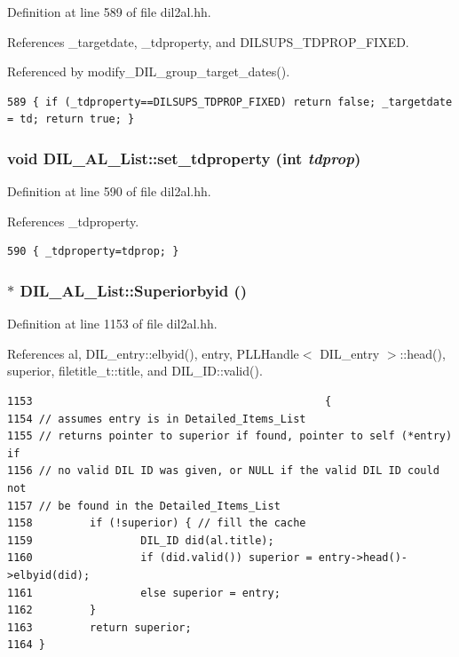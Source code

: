Definition at line 589 of file dil2al.hh.

References \_\-targetdate, \_\-tdproperty, and DILSUPS\_\-TDPROP\_\-FIXED.

Referenced by modify\_\-DIL\_\-group\_\-target\_\-dates().



\footnotesize\begin{verbatim}589 { if (_tdproperty==DILSUPS_TDPROP_FIXED) return false; _targetdate = td; return true; }
\end{verbatim}\normalsize 
{}
\subsubsection{\setlength{\rightskip}{0pt plus 5cm}void DIL\_\-AL\_\-List::set\_\-tdproperty (int {\em tdprop})\hspace{0.3cm}{\tt  [inline]}}\label{classDIL__AL__List_a8}




Definition at line 590 of file dil2al.hh.

References \_\-tdproperty.



\footnotesize\begin{verbatim}590 { _tdproperty=tdprop; }
\end{verbatim}\normalsize 
{}
\subsubsection{ $\ast$ DIL\_\-AL\_\-List::Superiorbyid ()\hspace{0.3cm}{\tt  [inline]}}\label{classDIL__AL__List_a3}




Definition at line 1153 of file dil2al.hh.

References al, DIL\_\-entry::elbyid(), entry, PLLHandle$<$ DIL\_\-entry $>$::head(), superior, filetitle\_\-t::title, and DIL\_\-ID::valid().



\footnotesize\begin{verbatim}1153                                              {
1154 // assumes entry is in Detailed_Items_List
1155 // returns pointer to superior if found, pointer to self (*entry) if
1156 // no valid DIL ID was given, or NULL if the valid DIL ID could not
1157 // be found in the Detailed_Items_List
1158         if (!superior) { // fill the cache
1159                 DIL_ID did(al.title);
1160                 if (did.valid()) superior = entry->head()->elbyid(did);
1161                 else superior = entry;
1162         }
1163         return superior;
1164 }
\end{verbatim}\normalsize 
{}
